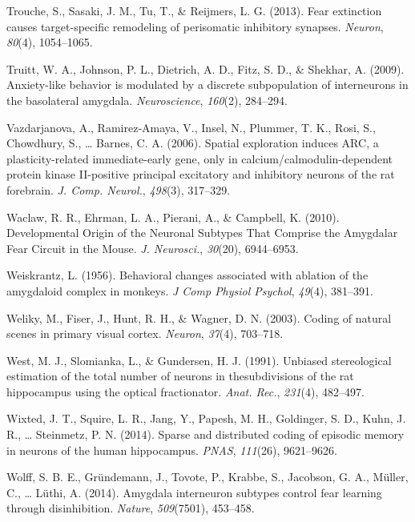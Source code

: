 \documentclass[12pt,a4paperpaper,]{report}
\begin{document}
\hypertarget{ref-troucheux5ffearux5f2013}{}
Trouche, S., Sasaki, J. M., Tu, T., \& Reijmers, L. G. (2013). Fear
extinction causes target-specific remodeling of perisomatic inhibitory
synapses. \emph{Neuron}, \emph{80}(4), 1054--1065.

\hypertarget{ref-truittux5fanxiety-likeux5f2009}{}
Truitt, W. A., Johnson, P. L., Dietrich, A. D., Fitz, S. D., \& Shekhar,
A. (2009). Anxiety-like behavior is modulated by a discrete
subpopulation of interneurons in the basolateral amygdala.
\emph{Neuroscience}, \emph{160}(2), 284--294.

\hypertarget{ref-vazdarjanovaux5fspatialux5f2006}{}
Vazdarjanova, A., Ramirez-Amaya, V., Insel, N., Plummer, T. K., Rosi,
S., Chowdhury, S., \ldots{} Barnes, C. A. (2006). Spatial exploration
induces ARC, a plasticity-related immediate-early gene, only in
calcium/calmodulin-dependent protein kinase II-positive principal
excitatory and inhibitory neurons of the rat forebrain. \emph{J. Comp.
Neurol.}, \emph{498}(3), 317--329.

\hypertarget{ref-waclawux5fdevelopmentalux5f2010}{}
Waclaw, R. R., Ehrman, L. A., Pierani, A., \& Campbell, K. (2010).
Developmental Origin of the Neuronal Subtypes That Comprise the
Amygdalar Fear Circuit in the Mouse. \emph{J. Neurosci.}, \emph{30}(20),
6944--6953.

\hypertarget{ref-weiskrantzux5fbehavioralux5f1956}{}
Weiskrantz, L. (1956). Behavioral changes associated with ablation of
the amygdaloid complex in monkeys. \emph{J Comp Physiol Psychol},
\emph{49}(4), 381--391.

\hypertarget{ref-welikyux5fcodingux5f2003}{}
Weliky, M., Fiser, J., Hunt, R. H., \& Wagner, D. N. (2003). Coding of
natural scenes in primary visual cortex. \emph{Neuron}, \emph{37}(4),
703--718.

\hypertarget{ref-westux5funbiasedux5f1991}{}
West, M. J., Slomianka, L., \& Gundersen, H. J. (1991). Unbiased
stereological estimation of the total number of neurons in
thesubdivisions of the rat hippocampus using the optical fractionator.
\emph{Anat. Rec.}, \emph{231}(4), 482--497.

\hypertarget{ref-wixtedux5fsparseux5f2014}{}
Wixted, J. T., Squire, L. R., Jang, Y., Papesh, M. H., Goldinger, S. D.,
Kuhn, J. R., \ldots{} Steinmetz, P. N. (2014). Sparse and distributed
coding of episodic memory in neurons of the human hippocampus.
\emph{PNAS}, \emph{111}(26), 9621--9626.

\hypertarget{ref-wolffux5famygdalaux5f2014}{}
Wolff, S. B. E., Gründemann, J., Tovote, P., Krabbe, S., Jacobson, G.
A., Müller, C., \ldots{} Lüthi, A. (2014). Amygdala interneuron subtypes
control fear learning through disinhibition. \emph{Nature},
\emph{509}(7501), 453--458.
\end{document}
